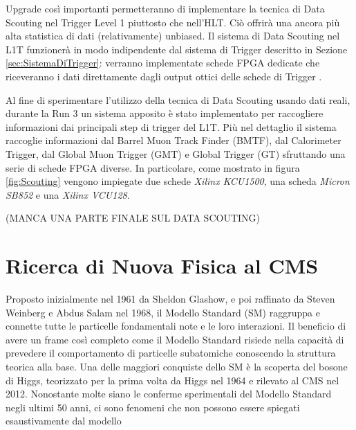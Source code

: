 Upgrade così importanti permetteranno di implementare la tecnica di Data Scouting nel Trigger Level 1 piuttosto che nell'HLT. Ciò offrirà una ancora più alta statistica di dati (relativamente) unbiased.\newline
Il sistema di Data Scouting nel L1T funzionerà in modo indipendente dal sistema di Trigger descritto in Sezione \ref{sec:SistemaDiTrigger}: verranno implementate schede FPGA dedicate che riceveranno i dati direttamente dagli output ottici delle schede di Trigger \cite{MasterThesisNicLai}.

Al fine di sperimentare l'utilizzo della tecnica di Data Scouting usando dati reali, durante la Run 3 un sistema apposito è stato implementato per raccogliere informazioni dai principali step di trigger del L1T. Più nel dettaglio il sistema raccoglie informazioni dal Barrel Muon Track Finder (BMTF), dal Calorimeter Trigger, dal Global Muon Trigger (GMT) e Global Trigger (GT) sfruttando una serie di schede FPGA diverse. In particolare, come mostrato in figura \ref{fig:Scouting} vengono impiegate due schede \textit{Xilinx KCU1500}, una scheda \textit{Micron SB852} e una \textit{Xilinx VCU128}. 


(MANCA UNA PARTE FINALE SUL DATA SCOUTING)




\section{Ricerca di Nuova Fisica al CMS}
\label{sec:NewPhysics}

Proposto inizialmente nel 1961 da Sheldon Glashow, e poi raffinato da Steven Weinberg e Abdus Salam nel 1968, il Modello Standard (SM) raggruppa e connette tutte le particelle fondamentali note e le loro interazioni. Il beneficio di avere un frame così completo come il Modello Standard risiede nella capacità di prevedere il comportamento di particelle subatomiche conoscendo la struttura teorica alla base. Una delle maggiori conquiste dello SM è la scoperta del bosone di Higgs, teorizzato per la prima volta da Higgs nel 1964 e rilevato al CMS nel 2012. \newline
Nonostante molte siano le conferme sperimentali del Modello Standard negli ultimi 50 anni, ci sono fenomeni che non possono essere spiegati esaustivamente dal modello






